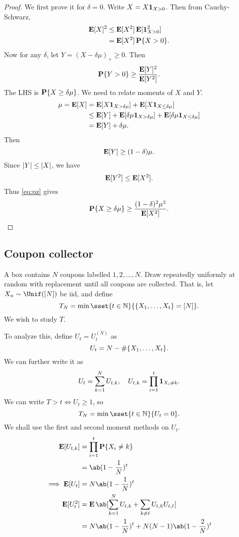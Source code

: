 \begin{proof}
    We first prove it for $\delta = 0$.
    Write $X = X \bm{1}_{X > 0}$.
    Then from Cauchy-Schwarz, \begin{align*}
        \operatorname{\mathbf E}[X]^2 &\le \operatorname{\mathbf E}[X^2] \operatorname{\mathbf E}[\bm{1}_{X > 0}^2] \\
        &= \operatorname{\mathbf E}[X^2] \operatorname{\mathbf P}\{X > 0\}.
    \end{align*}
    Now for any $\delta$, let $Y = (X - \delta \mu)_+ \ge 0$.
    Then \begin{equation}
        \operatorname{\mathbf P}\{Y > 0\} \ge \frac{\operatorname{\mathbf E}[Y]^2}{\operatorname{\mathbf E}[Y^2]}. \label{eq:pz}
    \end{equation} The LHS is $\operatorname{\mathbf P}\{X \ge \delta \mu\}$.
    We need to relate moments of $X$ and $Y$.
    \begin{align*}
        \mu = \operatorname{\mathbf E}[X]
            &= \operatorname{\mathbf E}[X \bm{1}_{X > \delta \mu}] + \operatorname{\mathbf E}[X \bm{1}_{X \le \delta \mu}] \\
            &\le \operatorname{\mathbf E}[Y] + \operatorname{\mathbf E}[\delta \mu \bm{1}_{X > \delta \mu}]
                    + \operatorname{\mathbf E}[\delta \mu \bm{1}_{X \le \delta \mu}] \\
            &= \operatorname{\mathbf E}[Y] + \delta \mu.
    \end{align*}
    Then \[
        \operatorname{\mathbf E}[Y] \ge (1 - \delta) \mu.
    \] Since $\lvert Y\rvert \le \lvert X\rvert$, we have \[
        \operatorname{\mathbf E}[Y^2] \le \operatorname{\mathbf E}[X^2].
    \]
    Thus \cref{eq:pz} gives \[
        \operatorname{\mathbf P}\{X \ge \delta \mu\} \ge \frac{(1 - \delta)^2 \mu^2}{\operatorname{\mathbf E}[X^2]}.
        \qedhere
    \]
\end{proof}

\subsection{Coupon collector} \label{sec:cc}
A box contains $N$ coupons labelled $1, 2, \dots, N$.
Draw repeatedly uniformly at random with replacement until all coupons are
collected.
That is, let $X_n \sim \Unif([N])$ be iid, and define \[
    T_N = \min\sset{t \in \N}{\set{X_1, \dots, X_t} = [N]}.
\] We wish to  study $T$.

To analyze this, define $U_t = U_t^{(N)}$ as \[
    U_t = N - \#\{X_1, \dots, X_t\}.
\] We can further write it as \[
    U_t = \sum_{k=1}^N U_{t,k}, \quad U_{t,k} = \prod_{i=1}^t \bm{1}_{X_i \ne k}.
\] We can write $T > t \iff U_t \ge 1$, so \[
    T_N = \min\sset{t \in \N}{U_t = 0}.
\]
We shall use the first and second moment methods on $U_t$.
\begin{align*}
    \E[U_{t,k}] &= \prod_{i=1}^t \P\set{X_i \ne k} \\
        &= \ab(1 - \frac1N)^t \\
    \implies \E[U_t] &= N \ab(1 - \frac1N)^t \\
    \E[U_t^2] &= \E\ab[\sum_{k=1}^{N} U_{t,k}
                + \sum_{k \ne \ell} U_{t,k} U_{t,\ell}] \\
        &= N \ab(1 - \frac1N)^t + N(N-1) \ab(1 - \frac2N)^t
\end{align*}

